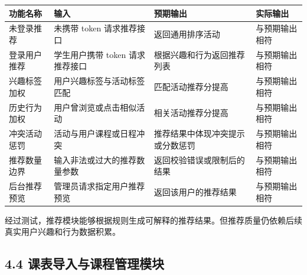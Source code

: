 {\def\LTcaptype{none} %
\begin{longtable}[]{@{}|
  >{\raggedright\arraybackslash}p{}|
  >{\raggedright\arraybackslash}p{}|
  >{\raggedright\arraybackslash}p{}|
  >{\raggedright\arraybackslash}p{}|@{}}
\hline
\rowcolor{gray!12}
\begin{minipage}[b]{\linewidth}\raggedright
\bfseries 功能名称
\end{minipage} & \begin{minipage}[b]{\linewidth}\raggedright
\bfseries 输入
\end{minipage} & \begin{minipage}[b]{\linewidth}\raggedright
\bfseries 预期输出
\end{minipage} & \begin{minipage}[b]{\linewidth}\raggedright
\bfseries 实际输出
\end{minipage} \\
\hline
\endhead
\hline
\endlastfoot
未登录推荐 & 未携带 token 请求推荐接口 & 返回通用排序活动 &
与预期输出相符 \\
\hline
登录用户推荐 & 学生用户携带 token 请求推荐接口 &
根据兴趣和行为返回推荐列表 & 与预期输出相符 \\
\hline
兴趣标签加权 & 用户兴趣标签与活动标签匹配 & 匹配活动推荐分提高 &
与预期输出相符 \\
\hline
历史行为加权 & 用户曾浏览或点击相似活动 & 相关活动推荐分提高 &
与预期输出相符 \\
\hline
冲突活动惩罚 & 活动与用户课程或日程冲突 &
推荐结果中体现冲突提示或分数惩罚 & 与预期输出相符 \\
\hline
推荐数量边界 & 输入非法或过大的推荐数量参数 & 返回校验错误或限制后的结果
& 与预期输出相符 \\
\hline
后台推荐预览 & 管理员请求指定用户推荐预览 & 返回该用户的推荐结果 &
与预期输出相符 \\
\hline
\end{longtable}
}

经过测试，推荐模块能够根据规则生成可解释的推荐结果。但推荐质量仍依赖后续真实用户兴趣和行为数据积累。

\subsection{4.4
课表导入与课程管理模块}\label{ux8bfeux8868ux5bfcux5165ux4e0eux8bfeux7a0bux7ba1ux7406ux6a21ux5757}

